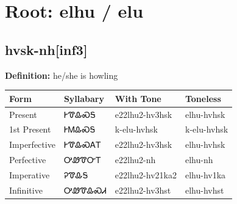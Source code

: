 \documentclass{article}%
\begin{document}
%
\normalsize%
\section*{Root: elhu / elu}%
\subsection*{hvsk-nh[inf3]}%
\textbf{Definition: }%
he/she is howling%
\\[0.5em]%
\begin{tabular}{|l|l|l|l|}%
\hline%
\textbf{Form}&\textbf{Syllabary}&\textbf{With Tone}&\textbf{Toneless}\\%
\hline%
Present&ᎨᏡᎲᏍᎦ&e22lhu2{-}hv3hsk&elhu{-}hvhsk\\%
1st Present&ᎨᎷᎲᏍᎦ&k{-}elu{-}hvhsk&k{-}elu{-}hvhsk\\%
Imperfective&ᎨᏡᎲᏍᎪᎢ&e22lhu2{-}hv3hsk&elhu{-}hvhsk\\%
Perfective&ᎤᏪᏡᏅᎢ&e22lhu2{-}nh&elhu{-}nh\\%
Imperative&ᎮᏡᎲᎦ&e22lhu2{-}hv21ka2&elhu{-}hv1ka\\%
Infinitive&ᎤᏪᏡᎲᏍᏗ&e22lhu2{-}hv3hst&elhu{-}hvhst\\%
\hline%
\end{tabular}%
\\[1em]%
\end{document}
